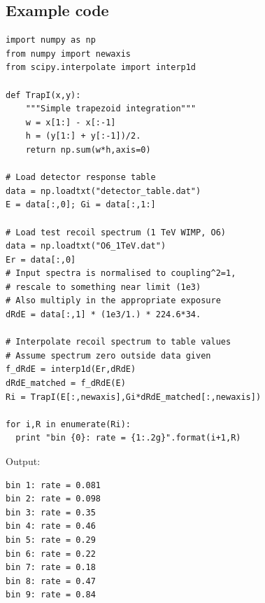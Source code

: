 \subsection{Example code}
\label{app:example_code}
\begin{lstlisting}
import numpy as np
from numpy import newaxis
from scipy.interpolate import interp1d

def TrapI(x,y):
    """Simple trapezoid integration"""
    w = x[1:] - x[:-1]
    h = (y[1:] + y[:-1])/2.
    return np.sum(w*h,axis=0)

# Load detector response table
data = np.loadtxt("detector_table.dat")
E = data[:,0]; Gi = data[:,1:]

# Load test recoil spectrum (1 TeV WIMP, O6)
data = np.loadtxt("O6_1TeV.dat")
Er = data[:,0]
# Input spectra is normalised to coupling^2=1,
# rescale to something near limit (1e3)
# Also multiply in the appropriate exposure
dRdE = data[:,1] * (1e3/1.) * 224.6*34.

# Interpolate recoil spectrum to table values
# Assume spectrum zero outside data given
f_dRdE = interp1d(Er,dRdE)
dRdE_matched = f_dRdE(E)
Ri = TrapI(E[:,newaxis],Gi*dRdE_matched[:,newaxis])

for i,R in enumerate(Ri):
  print "bin {0}: rate = {1:.2g}".format(i+1,R)
\end{lstlisting}

Output:

\begin{lstlisting}
bin 1: rate = 0.081
bin 2: rate = 0.098
bin 3: rate = 0.35
bin 4: rate = 0.46
bin 5: rate = 0.29
bin 6: rate = 0.22
bin 7: rate = 0.18
bin 8: rate = 0.47
bin 9: rate = 0.84
\end{lstlisting}

\vfill

